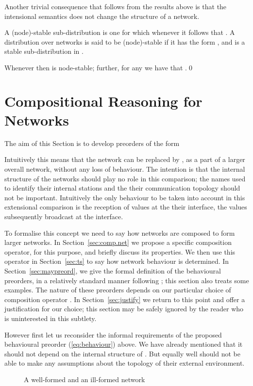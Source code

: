 \documentclass{LMCS}
\begin{document}
Another trivial consequence that follows from 
the results above is that the intensional 
semantics does not change the structure 
of a network. 

\begin{defi}
A (node)-stable sub-distribution  is one for which 
whenever  
it follows that .
A distribution over networks is said to 
be (node)-stable if it has the form 
, and  
is a stable sub-distribution in 
.
\end{defi}
\begin{cor}
\label{cor:stable.dist}

Whenever  
then  is node-stable; further, 
for any  
we have that .\qed
\end{cor}


\section{Compositional Reasoning for Networks}
\label{sec:compositional}


The aim of this Section is to  
develop preorders of the form

Intuitively this means that the network  can be replaced by
, as a part of a larger overall network, without any loss of
behaviour. The intention is that the internal structure of the
  networks  should play no role in this comparison; the
  names used to identify their internal stations and the their
  communication topology should not be important. Intuitively the only
  behaviour to be taken into account in this extensional comparison is
  the reception of values at the their interface, the values
  subsequently broadcast at the interface.  

To formalise this concept 
we need to  say how networks are composed to form larger networks.
In  
Section~\ref{sec:comp.net} we propose a specific composition  operator, 
for this purpose, and briefly discuss  its properties.  We then use
this operator in Section~\ref{sec:ts} to say how network behaviour is determined. 
In Section~\ref{sec:maypreord}, we  give 
the formal definition of the behavioural preorders, in a relatively standard manner following 
\cite{dnh}; this section also treats some  examples.
The nature of these preorders depends on our particular choice of
composition  operator . In Section~\ref{sec:justify} we return
to this point and offer a justification for our choice; this section may
be safely ignored by the reader who is uninterested in this subtlety.

However first let us reconsider the informal requirements of the
proposed behavioural preorder (\ref{eq:behaviour}) above. 
We have already mentioned that it should not depend on the internal 
structure of . But equally well  
should not be able to  make any assumptions about the topology 
of their external  environment. 
\begin{figure}


                                   




 \caption{A well-formed and an ill-formed network}
\label{fig:wellformed}
\end{figure}
\end{document}
